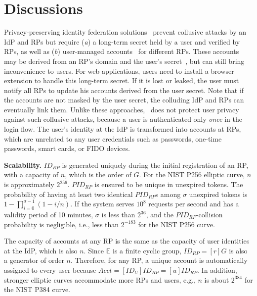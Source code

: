 \section{Discussions}
\label{sec:discussion}

Privacy-preserving identity federation solutions~\cite{ELPASSO, UnlimitID, idemix, PseudoID, Opaak, uprov}
 prevent collusive attacks by an IdP and RPs
 but require (\emph{a}) a long-term secret held by a user and verified by RPs,
  as well as (\emph{b}) user-managed accounts~\cite{PseudoID} for different RPs.
These accounts may be derived from an RP's domain and the user's secret~\cite{ELPASSO, UnlimitID, Opaak, uprov,idemix},
 but can still bring inconvenience to users.
For web applications, users need to install a browser extension to handle this long-term secret.
If it is lost or leaked, the user must notify all RPs to update his accounts derived from the user secret.
Note that if the accounts are not masked by the user secret, the colluding IdP and RPs can eventually link them.
Unlike these approaches, \usso~does not protect user privacy against such collusive attacks,
 because a user is authenticated only \emph{once} in the login flow.
 The user's identity at the IdP is transformed into accounts at RPs,
  which are unrelated to any user credentials such as passwords, one-time passwords, smart cards, or FIDO devices.

\noindent \textbf{Scalability.} $ID_{RP}$ is generated uniquely during the initial registration of an RP,
 with a capacity of $n$, which is the order of $G$. For the NIST P256 elliptic curve, $n$ is approximately $2^{256}$.
$PID_{RP}$ is ensured to be unique in unexpired tokens.
The probability of having at least two identical $PID_{RP}$s among $\sigma$ unexpired tokens is $1-\prod_{i=0}^{\sigma-1}(1-i/n)$.
If the system serves $10^{8}$ requests per second and has a validity period of 10 minutes, $\sigma$ is less than $2^{36}$,
 and the $PID_{RP}$-collision probability is negligible, i.e., less than $2^{-183}$ for the NIST P256 curve.

The capacity of accounts at any RP is the same as the capacity of user identities at the IdP,
 which is also $n$. Since $\mathbb{E}$ is a finite cyclic group, $ID_{RP} = [r]G$ is also a generator of order $n$.
 Therefore, for any RP, a unique account is automatically assigned to every user because $Acct =  [ID_U]ID_{RP} = [u]ID_{RP}$.
In addition, stronger elliptic curves accommodate more RPs and users, e.g., $n$ is about $2^{384}$ for the NIST P384 curve.


